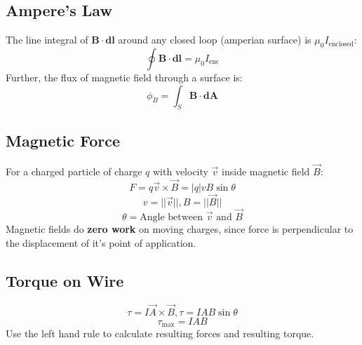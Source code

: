 \subsection{Ampere's Law}
The line integral of $\mathbf{B}\cdot\mathbf{dl}$ around any closed loop (amperian surface) is $\mu_0 I_{\text{enclosed}}$:
$$\oint \mathbf{B}\cdot\mathbf{dl}=\mu_0 I_{\text{enc}}$$
Further, the flux of magnetic field through a surface is:
$$\phi_B=\int_S\mathbf{B}\cdot\mathbf{dA}$$
\subsection{Magnetic Force}
For a charged particle of charge $q$ with velocity $\vec{v}$ inside magnetic field $\vec{B}$:
$$F = q\vec{v}\times\vec{B}=|q|vB\sin\theta$$
$$v=||\vec{v}||, B=||\vec{B}||$$
$$\theta=\text{Angle between } \vec{v} \text{ and } \vec{B}$$
Magnetic fields do \textbf{zero work} on moving charges, since force is perpendicular to the displacement of it's point of application.
\subsection{Torque on Wire}
$$\tau=I\vec{A}\times\vec{B}, \tau=IAB\sin\theta$$
$$\tau_{\text{max}}=IAB$$
Use the left hand rule to calculate resulting forces and resulting torque.
